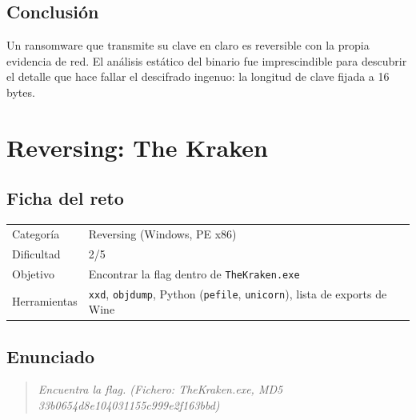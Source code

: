 \documentclass[11pt,a4paper]{article}
\begin{document}
\subsection{Conclusión}
Un ransomware que transmite su clave en claro es reversible con la propia evidencia de red. El análisis estático del
binario fue imprescindible para descubrir el detalle que hace fallar el descifrado ingenuo: la longitud de clave
fijada a 16 bytes.


\clearpage
\section{Reversing: The Kraken}

\subsection{Ficha del reto}
\begin{tabularx}{\linewidth}{@{}lX@{}}
\toprule
Categoría & Reversing (Windows, PE x86) \\
Dificultad & 2/5 \\
Objetivo & Encontrar la flag dentro de \texttt{TheKraken.exe} \\
Herramientas & \texttt{xxd}, \texttt{objdump}, Python (\texttt{pefile}, \texttt{unicorn}), lista de exports de Wine \\
\bottomrule
\end{tabularx}

\subsection{Enunciado}
\begin{quote}\itshape Encuentra la flag. (Fichero: TheKraken.exe, MD5 33b0654d8e104031155c999e2f163bbd)\end{quote}
\end{document}

